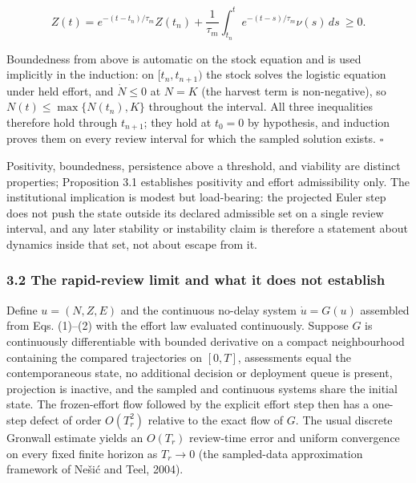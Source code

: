 \documentclass[11pt]{article}
\begin{document}
\[
Z(t)=e^{-(t-t_n)/\tau_m}Z(t_n)+\frac{1}{\tau_m}\int_{t_n}^{t}e^{-(t-s)/\tau_m}\nu(s)\,ds\ \ge 0 .
\]

Boundedness from above is automatic on the stock equation and is used
implicitly in the induction: on \([t_n, t_{n+1})\) the stock solves the
logistic equation under held effort, and \(\dot N \le 0\) at \(N = K\)
(the harvest term is non-negative), so \(N(t) \le \max\{N(t_n), K\}\)
throughout the interval. All three inequalities therefore hold through
\(t_{n+1}\); they hold at \(t_0=0\) by hypothesis, and induction proves
them on every review interval for which the sampled solution exists. \ensuremath{\square}

Positivity, boundedness, persistence above a threshold, and viability
are distinct properties; Proposition 3.1 establishes positivity and
effort admissibility only. The institutional implication is modest but
load-bearing: the projected Euler step does not push the state outside
its declared admissible set on a single review interval, and any later
stability or instability claim is therefore a statement about dynamics
inside that set, not about escape from it.

\subsubsection{3.2 The rapid-review limit and what it does not
establish}\label{the-rapid-review-limit-and-what-it-does-not-establish}

Define \(u=(N,Z,E)\) and the continuous no-delay system \(\dot u=G(u)\)
assembled from Eqs. (1)--(2) with the effort law evaluated continuously.
Suppose \(G\) is continuously differentiable with bounded derivative on
a compact neighbourhood containing the compared trajectories on
\([0,T]\), assessments equal the contemporaneous state, no additional
decision or deployment queue is present, projection is inactive, and the
sampled and continuous systems share the initial state. The
frozen-effort flow followed by the explicit effort step then has a
one-step defect of order \(O(T_r^2)\) relative to the exact flow of
\(G\). The usual discrete Gronwall estimate yields an \(O(T_r)\)
review-time error and uniform convergence on every fixed finite horizon
as \(T_r\to 0\) (the sampled-data approximation framework of Ne\v{s}i\'c and
Teel, 2004).
\end{document}
